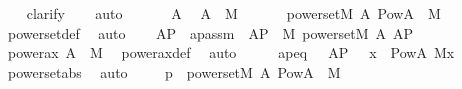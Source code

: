 \begin{isabellebody}
%
\isadelimproof
\ \ %
\endisadelimproof
%
\isatagproof
{}\isamarkupfalse%
\ {\isacharparenleft}{\kern0pt}clarify{\isacharparenright}{\kern0pt}\isanewline
\ \ \isamarkupfalse%
\ {\isacharparenleft}{\kern0pt}auto{\isacharparenright}{\kern0pt}\isanewline
{}\isamarkupfalse%
\ {\isacharminus}{\kern0pt}\ \isanewline
\ \ \isamarkupfalse%
\ A\ \isamarkupfalse%
\ {\isachardoublequoteopen}A\ {\isasymin}\ M{\isachardoublequoteclose}\ \isanewline
\ \ \isamarkupfalse%
\ \isamarkupfalse%
\ {\isachardoublequoteopen}powerset{\isacharparenleft}{\kern0pt}{\isacharhash}{\kern0pt}{\isacharhash}{\kern0pt}M{\isacharcomma}{\kern0pt}\ A{\isacharcomma}{\kern0pt}\ Pow{\isacharparenleft}{\kern0pt}A{\isacharparenright}{\kern0pt}\ {\isasyminter}\ M{\isacharparenright}{\kern0pt}{\isachardoublequoteclose}\isamarkupfalse%
\ powerset{\isacharunderscore}{\kern0pt}def\ \isamarkupfalse%
\ auto\isanewline
\ \ \isamarkupfalse%
\ AP\ \ apassm{\isacharcolon}{\kern0pt}\ \ {\isachardoublequoteopen}AP\ {\isasymin}\ M{\isachardoublequoteclose}\ {\isachardoublequoteopen}powerset{\isacharparenleft}{\kern0pt}{\isacharhash}{\kern0pt}{\isacharhash}{\kern0pt}M{\isacharcomma}{\kern0pt}\ A{\isacharcomma}{\kern0pt}\ AP{\isacharparenright}{\kern0pt}{\isachardoublequoteclose}\ \isanewline
\ \ \ \ \isamarkupfalse%
\ power{\isacharunderscore}{\kern0pt}ax\ {\isacartoucheopen}A\ {\isasymin}\ M{\isacartoucheclose}\ \isamarkupfalse%
\ power{\isacharunderscore}{\kern0pt}ax{\isacharunderscore}{\kern0pt}def\ \isamarkupfalse%
\ auto\isanewline
\ \ \isamarkupfalse%
\ \isamarkupfalse%
\ apeq\ {\isacharcolon}{\kern0pt}\ \ {\isachardoublequoteopen}AP\ {\isacharequal}{\kern0pt}\ {\isacharbraceleft}{\kern0pt}\ x\ {\isasymin}\ Pow{\isacharparenleft}{\kern0pt}A{\isacharparenright}{\kern0pt}{\isachardot}{\kern0pt}\ {\isacharparenleft}{\kern0pt}{\isacharhash}{\kern0pt}{\isacharhash}{\kern0pt}M{\isacharparenright}{\kern0pt}{\isacharparenleft}{\kern0pt}x{\isacharparenright}{\kern0pt}\ {\isacharbraceright}{\kern0pt}{\isachardoublequoteclose}\ \isamarkupfalse%
\ powerset{\isacharunderscore}{\kern0pt}abs\ \isamarkupfalse%
\ auto\ \isanewline
\ \ \isamarkupfalse%
\ p{}\ {\isacharcolon}{\kern0pt}\ {\isachardoublequoteopen}powerset{\isacharparenleft}{\kern0pt}{\isacharhash}{\kern0pt}{\isacharhash}{\kern0pt}M{\isacharcomma}{\kern0pt}\ A{\isacharcomma}{\kern0pt}\ Pow{\isacharparenleft}{\kern0pt}A{\isacharparenright}{\kern0pt}\ {\isasyminter}\ M{\isacharparenright}{\kern0pt}{\isachardoublequoteclose}\ \isamarkupfalse%

\end{isabellebody}

